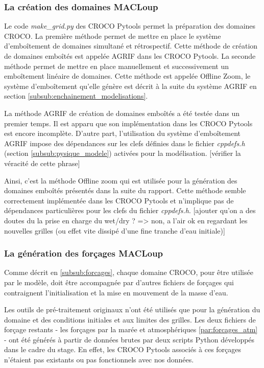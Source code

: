 \documentclass[10pt,a4paper,titlepage]{article}
\begin{document}
\subsubsection{La création des domaines MACLoup}
\label{subsub:gestion_multi_domaines}
Le code \textit{make\_grid.py} des CROCO Pytools permet la préparation des domaines CROCO.
La première méthode permet de mettre en place le système d'emboîtement de domaines simultané et rétrospectif.
Cette méthode de création de domaines emboîtés est appelée AGRIF dans les CROCO Pytools.
La seconde méthode permet de mettre en place manuellement et successivement un emboîtement linéaire de domaines.
Cette méthode est appelée Offline Zoom, le système d'emboîtement qu'elle génère est décrit à la suite du système AGRIF en section \ref{subsub:enchainement_modelisations}.

La méthode AGRIF de création de domaines emboîtés a été testée dans un premier temps.
Il est apparu que son implémentation dans les CROCO Pytools est encore incomplète.
D'autre part, l'utilisation du système d'emboîtement AGRIF impose des dépendances sur les clefs définies dans le fichier \textit{cppdefs.h} (section \ref{subsub:pysique_modele}) activées pour la modélisation.
[vérifier la véracité de cette phrase]

Ainsi, c'est la méthode Offline zoom qui est utilisée pour la génération des domaines emboîtés présentés dans la suite du rapport.
Cette méthode semble correctement implémentée dans les CROCO Pytools et n'implique pas de dépendances particulières pour les clefs du fichier \textit{cppdefs.h}.
[ajouter qu'on a des doutes du la prise en charge du wet/dry ? => non, a l'air ok en regardant les nouvelles grilles (ou effet vite dissipé d'une fine tranche d'eau initiale)]

\subsubsection{La génération des forçages MACLoup}
\label{generation_donnees_entrée}
Comme décrit en \ref{subsub:forcages}, chaque domaine CROCO, pour être utilisée par le modèle, doit être accompagnée par d'autres fichiers de forçages qui contraignent l'initialisation et la mise en mouvement de la masse d'eau.

Les outils de pré-traitement originaux n'ont été utilisés que pour la génération du domaine et des conditions initiales et aux limites des grilles.
Les deux fichiers de forçage restants - les forçages par la marée et atmosphériques \ref{par:forcages_atm} - ont été générés à partir de données brutes par deux scripts Python développés dans le cadre du stage.
En effet, les CROCO Pytools associés à ces forçages n'étaient pas existants ou pas fonctionnels avec nos données.
\end{document}
